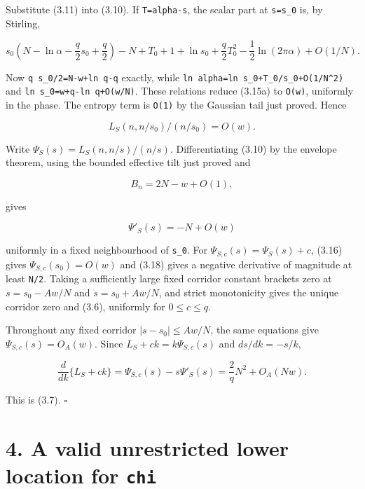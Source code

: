 \documentclass[
  11pt,
  a4paper,
]{article}
\begin{document}
Substitute (3.11) into (3.10). If \texttt{T=alpha-s}, the scalar part at
\texttt{s=s\_0} is, by Stirling,

\[
 s_0\left(N-\ln\alpha-\frac q2s_0+\frac q2\right)-N
 +T_0+1+\ln s_0+\frac q2T_0^2
 -\frac12\ln(2\pi\alpha)+O(1/N).                        \tag{3.15a}
\]

Now
\texttt{q\ s\_}\allowbreak{}\texttt{0/}\allowbreak{}\texttt{2=}\allowbreak{}\texttt{N-w+}\allowbreak{}\texttt{ln\ q-q}
exactly, while
\texttt{ln\ alpha=}\allowbreak{}\texttt{ln\ s\_}\allowbreak{}\texttt{0+}\allowbreak{}\texttt{T\_}\allowbreak{}\texttt{0/}\allowbreak{}\texttt{s\_}\allowbreak{}\texttt{0+}\allowbreak{}\texttt{O(1/}\allowbreak{}\texttt{N\^{}2)}
and
\texttt{ln\ s\_}\allowbreak{}\texttt{0=}\allowbreak{}\texttt{w+}\allowbreak{}\texttt{q-ln\ q+}\allowbreak{}\texttt{O(w/}\allowbreak{}\texttt{N)}.
These relations reduce (3.15a) to \texttt{O(w)}, uniformly in the phase.
The entropy term is \texttt{O(1)} by the Gaussian tail just proved.
Hence

\[
 L_S(n,n/s_0)/(n/s_0)=O(w).                              \tag{3.16}
\]

Write \(\Psi_S(s)=L_S(n,n/s)/(n/s)\). Differentiating (3.10) by the
envelope theorem, using the bounded effective tilt just proved and

\[
 B_n=2N-w+O(1),                                          \tag{3.17}
\]

gives

\[
 \Psi'_S(s)
 =-N+O(w)                                                \tag{3.18}
\]

uniformly in a fixed neighbourhood of \texttt{s\_0}. For
\(\Psi_{S,c}(s)=\Psi_S(s)+c\), (3.16) gives \(\Psi_{S,c}(s_0)=O(w)\) and
(3.18) gives a negative derivative of magnitude at least \texttt{N/2}.
Taking a sufficiently large fixed corridor constant brackets zero at
\(s=s_0-Aw/N\) and \(s=s_0+Aw/N\), and strict monotonicity gives the
unique corridor zero and (3.6), uniformly for \(0\le c\le q\).

Throughout any fixed corridor \(|s-s_0|\le Aw/N\), the same equations
give \(\Psi_{S,c}(s)=O_A(w)\). Since \(L_S+ck=k\Psi_{S,c}(s)\) and
\(ds/dk=-s/k\),

\[
 \frac{d}{dk}\{L_S+ck\}
 =\Psi_{S,c}(s)-s\Psi'_S(s)
 =\frac2qN^2+O_A(Nw).                                    \tag{3.19}
\]

This is (3.7). \(\square\)

\section{\texorpdfstring{4. A valid unrestricted lower location for
\texttt{chi}}{4. A valid unrestricted lower location for chi}}\label{a-valid-unrestricted-lower-location-for-chi}
\end{document}
